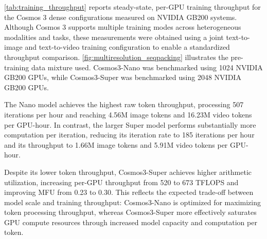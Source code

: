 \documentclass{llmxive}
\begin{document}
\cref{tab:training_throughput} reports steady-state, per-GPU training throughput for the Cosmos 3 dense configurations measured on NVIDIA GB200 systems. Although Cosmos 3 supports multiple training modes across heterogeneous modalities and tasks, these measurements were obtained using a joint text-to-image and text-to-video training configuration to enable a standardized throughput comparison. \cref{fig:multiresolution_seqpacking} illustrates the pre-training data mixture used. Cosmos3-Nano was benchmarked using 1024 NVIDIA GB200 GPUs, while Cosmos3-Super was benchmarked using 2048 NVIDIA GB200 GPUs.

The Nano model achieves the highest raw token throughput, processing 507 iterations per hour and reaching 4.56M image tokens and 16.23M video tokens per GPU-hour. In contrast, the larger Super model performs substantially more computation per iteration, reducing its iteration rate to 185 iterations per hour and its throughput to 1.66M image tokens and 5.91M video tokens per GPU-hour.

Despite its lower token throughput, Cosmos3-Super achieves higher arithmetic utilization, increasing per-GPU throughput from 520 to 673 TFLOPS and improving MFU from 0.23 to 0.30. This reflects the expected trade-off between model scale and training throughput: Cosmos3-Nano is optimized for maximizing token processing throughput, whereas Cosmos3-Super more effectively saturates GPU compute resources through increased model capacity and computation per token.

\begin{table}[t]
    \centering
    \setlength{\tabcolsep}{5pt}
\caption{\textbf{Steady-state training throughput for Cosmos 3 dense model configurations.} TFLOPS and MFU are reported per GPU. Image and video token throughput are reported separately in millions of tokens per GPU-hour. The experiments were conducted with NVIDIA GB200 GPUs, where the Nano and Super runs took 2048 and 4096 GPUs, respectively.}
\label{tab:training_throughput}
\end{table}
\end{document}
